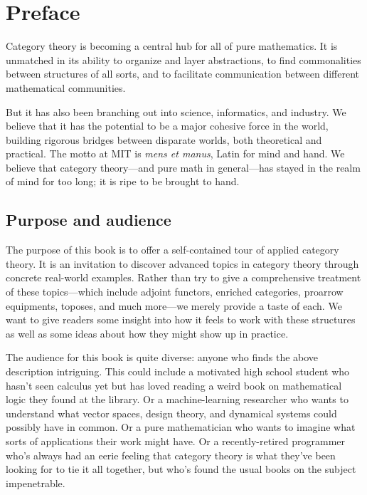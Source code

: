 \documentclass[7Sketches]{subfiles}
\begin{document}
\chapter*{Preface}

Category theory is becoming a central hub for all of pure mathematics. It is unmatched in its ability to organize and layer abstractions, to find commonalities between structures of all sorts, and to facilitate communication between different mathematical communities.

But it has also been branching out into science, informatics, and industry. We believe that it has the potential to be a major cohesive force in the world, building rigorous bridges between disparate worlds, both theoretical and practical. The motto at MIT is \emph{mens et manus}, Latin for mind and hand. We believe that category theory---and pure math in general---has stayed in the realm of mind for too long; it is ripe to be brought to hand.

\section*{Purpose and audience}

The purpose of this book is to offer a self-contained tour of applied category theory. It is an invitation to discover advanced topics in category theory through concrete real-world examples. Rather than try to give a comprehensive treatment of these topics---which include adjoint functors, enriched categories, proarrow equipments, toposes, and much more---we merely provide a taste of each. We want to give readers some insight into how it feels to work with these structures as well as some ideas about how they might show up in practice.

The audience for this book is quite diverse: anyone who finds the above description intriguing. This could include a motivated high school student who hasn't seen calculus yet but has loved reading a weird book on mathematical logic they found at the library. Or a machine-learning researcher who wants to understand what vector spaces, design theory, and dynamical systems could possibly have in common. Or a pure mathematician who wants to imagine what sorts of applications their work might have. Or a recently-retired programmer who's always had an eerie feeling that category theory is what they've been looking for to tie it all together, but who's found the usual books on the subject impenetrable.
\end{document}
